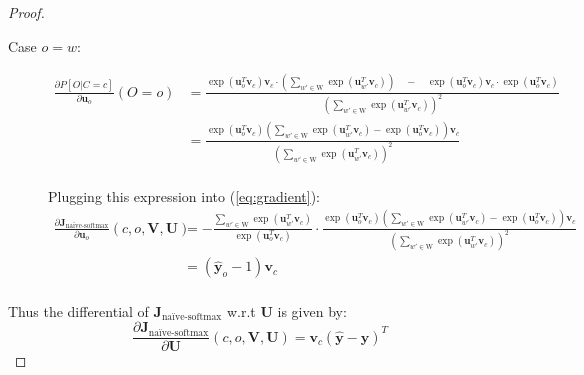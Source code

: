 \begin{proof}
\begin{description}
      \item[Case $o = w$:]
      \begin{equation*}
        \begin{split}
          \frac{\partial P[O | C=c]}{\partial \bm{u}_o}(O=o) 
          & =  \frac{\exp(\bm{u}_{o}^T \bm{v}_c) \bm{v}_c \cdot \left(\sum\limits_{w' \in \text{W}} \exp(\bm{u}_{w'}^T \bm{v}_c)\right) \quad - \quad \exp(\bm{u}_{o}^T \bm{v}_c) \bm{v}_c \cdot \exp(\bm{u}_{o}^T \bm{v}_c)}{\left(\sum\limits_{w' \in \text{W}} \exp(\bm{u}_{w'}^T \bm{v}_c)\right)^2} \\
          & = \frac{\exp(\bm{u}_{o}^T \bm{v}_c)\left(\sum\limits_{w' \in \text{W}} \exp(\bm{u}_{w'}^T \bm{v}_c) - \exp(\bm{u}_{o}^T \bm{v}_c) \right) \bm{v}_c}{\left(\sum\limits_{w' \in \text{W}} \exp(\bm{u}_{w'}^T \bm{v}_c)\right)^2} \\
        \end{split}
      \end{equation*}

      Plugging this expression into (\ref{eq:gradient}):
      \begin{equation*}
        \begin{split}
          \frac{\partial \bm{J}_{\text{na\"ive-softmax}}}{\partial \bm{u}_o}(c,o,\bm{V},\bm{U})
          & = - \frac{\sum\limits_{w' \in \text{W}} \exp(\bm{u}_{w'}^T \bm{v}_c)}{\exp(\bm{u}_{o}^T \bm{v}_c)} \cdot \frac{\exp(\bm{u}_{o}^T \bm{v}_c)\left(\sum\limits_{w' \in \text{W}} \exp(\bm{u}_{w'}^T \bm{v}_c) - \exp(\bm{u}_{o}^T \bm{v}_c) \right) \bm{v}_c}{\left(\sum\limits_{w' \in \text{W}} \exp(\bm{u}_{w'}^T \bm{v}_c)\right)^2} \\
          & = (\hat{\bm{y}}_o - 1)\bm{v}_c \\
        \end{split}
      \end{equation*}

  \end{description}

  Thus the differential of $\bm{J}_{\text{na\"ive-softmax}}$ w.r.t $\bm{U}$ is given by:
  \begin{equation*}
    \frac{\partial \bm{J}_{\text{na\"ive-softmax}}}{\partial \bm{U}}(c,o,\bm{V},\bm{U}) = \bm{v}_c(\hat{\bm{y}} - \bm{y})^T
  \end{equation*}

\end{proof}